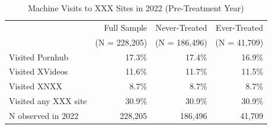 \begin{table}[h!]
\centering
\caption{Machine Visits to XXX Sites in 2022 (Pre-Treatment Year)}
\label{tab:xxx_visits_2022}
\begin{tabular}{lrrr}
\toprule
 & Full Sample & Never-Treated & Ever-Treated \\
 & (N = 228,205) & (N = 186,496) & (N = 41,709) \\
\midrule
Visited Pornhub & 17.3\% & 17.4\% & 16.9\% \\
Visited XVideos & 11.6\% & 11.7\% & 11.5\% \\
Visited XNXX & 8.7\% & 8.7\% & 8.7\% \\
Visited any XXX site & 30.9\% & 30.9\% & 30.9\% \\
\midrule
N observed in 2022 & 228,205 & 186,496 & 41,709 \\
\bottomrule
\end{tabular}
\end{table}
